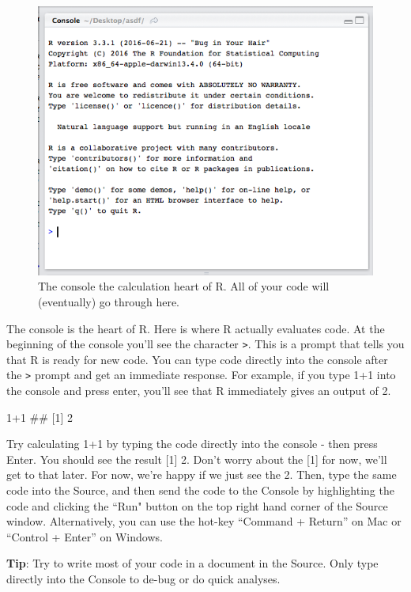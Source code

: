 \documentclass[]{book}
\newenvironment{Shaded}{\begin{snugshade}}{\end{snugshade}}
\newcommand{\DecValTok}[1]{\textcolor[rgb]{0.00,0.00,0.81}{{#1}}}
\newcommand{\NormalTok}[1]{{#1}}
\theoremstyle{definition}
\theoremstyle{definition}
\theoremstyle{remark}
\begin{document}
\begin{figure}
\includegraphics[width=0.75\linewidth]{images/consoless} \caption{The console the calculation heart of R. All of your code will (eventually) go through here.}\label{fig:consolewindow}
\end{figure}

The console is the heart of R. Here is where R actually evaluates code.
At the beginning of the console you'll see the character \texttt{>}.
This is a prompt that tells you that R is ready for new code. You can
type code directly into the console after the \texttt{>} prompt and get
an immediate response. For example, if you type 1+1 into the console and
press enter, you'll see that R immediately gives an output of 2.

\begin{Shaded}
\begin{Highlighting}[]
\DecValTok{1+1}
\NormalTok{## [1] 2}
\end{Highlighting}
\end{Shaded}

Try calculating 1+1 by typing the code directly into the console - then
press Enter. You should see the result {[}1{]} 2. Don't worry about the
{[}1{]} for now, we'll get to that later. For now, we're happy if we
just see the 2. Then, type the same code into the Source, and then send
the code to the Console by highlighting the code and clicking the ``Run"
button on the top right hand corner of the Source window. Alternatively,
you can use the hot-key ``Command + Return'' on Mac or ``Control +
Enter'' on Windows.

\textbf{Tip}: Try to write most of your code in a document in the
Source. Only type directly into the Console to de-bug or do quick
analyses.
\end{document}
